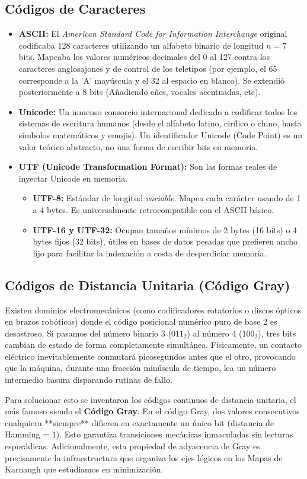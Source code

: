 \subsection{Códigos de Caracteres}
\begin{itemize}
    \item \textbf{ASCII:} El \textit{American Standard Code for Information Interchange} original codificaba 128 caracteres utilizando un alfabeto binario de longitud $n=7$ bits. Mapeaba los valores numéricos decimales del 0 al 127 contra los caracteres anglosajones y de control de los teletipos (por ejemplo, el 65 corresponde a la 'A' mayúscula y el 32 al espacio en blanco). Se extendió posteriormente a 8 bits (Añadiendo eñes, vocales acentuadas, etc).
    \item \textbf{Unicode:} Un inmenso consorcio internacional dedicado a codificar todos los sistemas de escritura humanos (desde el alfabeto latino, cirílico o chino, hasta símbolos matemáticos y emojis). Un identificador Unicode (Code Point) es un valor teórico abstracto, no una forma de escribir bits en memoria.
    \item \textbf{UTF (Unicode Transformation Format):} Son las formas reales de inyectar Unicode en memoria. 
    \begin{itemize}
        \item \textbf{UTF-8:} Estándar de longitud \textit{variable}. Mapea cada carácter usando de 1 a 4 bytes. Es universalmente retrocompatible con el ASCII básico.
        \item \textbf{UTF-16 y UTF-32:} Ocupan tamaños mínimos de 2 bytes (16 bits) o 4 bytes fijos (32 bits), útiles en bases de datos pesadas que prefieren ancho fijo para facilitar la indexación a costa de desperdiciar memoria.
    \end{itemize}
\end{itemize}

\subsection{Códigos de Distancia Unitaria (Código Gray)}
Existen dominios electromecánicos (como codificadores rotatorios o discos ópticos en brazos robóticos) donde el código posicional numérico puro de base 2 es desastroso. Si pasamos del número binario 3 ($011_2$) al número 4 ($100_2$), tres bits cambian de estado de forma completamente simultánea. Físicamente, un contacto eléctrico inevitablemente conmutará picosegundos antes que el otro, provocando que la máquina, durante una fracción minúscula de tiempo, lea un número intermedio basura disparando rutinas de fallo.

Para solucionar esto se inventaron los códigos continuos de distancia unitaria, el más famoso siendo el \textbf{Código Gray}.
En el código Gray, dos valores consecutivos cualquiera **siempre** difieren en exactamente un único bit (distancia de Hamming = $1$). Esto garantiza transiciones mecánicas inmaculadas sin lecturas esporádicas. Adicionalmente, esta propiedad de adyacencia de Gray es precisamente la infraestructura que organiza los ejes lógicos en los Mapas de Karnaugh que estudiamos en minimización.
